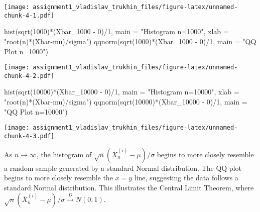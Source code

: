 \documentclass[
]{article}
\newenvironment{Shaded}{\begin{snugshade}}{\end{snugshade}}
\newcommand{\AttributeTok}[1]{\textcolor[rgb]{0.77,0.63,0.00}{#1}}
\newcommand{\DecValTok}[1]{\textcolor[rgb]{0.00,0.00,0.81}{#1}}
\newcommand{\FunctionTok}[1]{\textcolor[rgb]{0.00,0.00,0.00}{#1}}
\newcommand{\NormalTok}[1]{#1}
\newcommand{\SpecialCharTok}[1]{\textcolor[rgb]{0.00,0.00,0.00}{#1}}
\newcommand{\StringTok}[1]{\textcolor[rgb]{0.31,0.60,0.02}{#1}}
\begin{document}
\texttt{[image: assignment1\_vladislav\_trukhin\_files/figure-latex/unnamed-chunk-4-1.pdf]}

\begin{Shaded}
\begin{Highlighting}[]
\FunctionTok{hist}\NormalTok{(}\FunctionTok{sqrt}\NormalTok{(}\DecValTok{1000}\NormalTok{)}\SpecialCharTok{*}\NormalTok{(Xbar\_1000 }\SpecialCharTok{{-}} \DecValTok{0}\NormalTok{)}\SpecialCharTok{/}\DecValTok{1}\NormalTok{, }\AttributeTok{main =} \StringTok{"Histogram n=1000"}\NormalTok{, }\AttributeTok{xlab =} \StringTok{"root(n)*(Xbar{-}mu)/sigma"}\NormalTok{)}
\FunctionTok{qqnorm}\NormalTok{(}\FunctionTok{sqrt}\NormalTok{(}\DecValTok{1000}\NormalTok{)}\SpecialCharTok{*}\NormalTok{(Xbar\_1000 }\SpecialCharTok{{-}} \DecValTok{0}\NormalTok{)}\SpecialCharTok{/}\DecValTok{1}\NormalTok{, }\AttributeTok{main =} \StringTok{"QQ Plot n=1000"}\NormalTok{)}
\end{Highlighting}
\end{Shaded}

\texttt{[image: assignment1\_vladislav\_trukhin\_files/figure-latex/unnamed-chunk-4-2.pdf]}

\begin{Shaded}
\begin{Highlighting}[]
\FunctionTok{hist}\NormalTok{(}\FunctionTok{sqrt}\NormalTok{(}\DecValTok{10000}\NormalTok{)}\SpecialCharTok{*}\NormalTok{(Xbar\_10000 }\SpecialCharTok{{-}} \DecValTok{0}\NormalTok{)}\SpecialCharTok{/}\DecValTok{1}\NormalTok{, }\AttributeTok{main =} \StringTok{"Histogram n=10000"}\NormalTok{, }\AttributeTok{xlab =} \StringTok{"root(n)*(Xbar{-}mu)/sigma"}\NormalTok{)}
\FunctionTok{qqnorm}\NormalTok{(}\FunctionTok{sqrt}\NormalTok{(}\DecValTok{10000}\NormalTok{)}\SpecialCharTok{*}\NormalTok{(Xbar\_10000 }\SpecialCharTok{{-}} \DecValTok{0}\NormalTok{)}\SpecialCharTok{/}\DecValTok{1}\NormalTok{, }\AttributeTok{main =} \StringTok{"QQ Plot n=10000"}\NormalTok{)}
\end{Highlighting}
\end{Shaded}

\texttt{[image: assignment1\_vladislav\_trukhin\_files/figure-latex/unnamed-chunk-4-3.pdf]}

As \(n \rightarrow \infty\), the histogram of
\(\sqrt{n}(\bar{X}_n^{(i)} - \mu)/\sigma\) begins to more closely
resemble a random sample generated by a standard Normal distribution.
The QQ plot begins to more closely resemble the \(x = y\) line,
suggesting the data follows a standard Normal distribution. This
illustrates the Central Limit Theorem, where
\(\sqrt{n}(\bar{X}_n^{(i)} - \mu)/\sigma \overset{D}{\rightarrow} N(0, 1)\).
\end{document}
